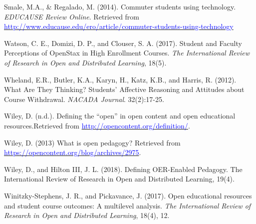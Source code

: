 \documentclass[11pt]{article}
\newcommand{\alink}[2]{\href{#1}{\textcolor{blue}{#2}}}
\begin{document}
\begin{thebibliography}{99}
   Smale, M.A., \& Regalado, M. (2014). Commuter students using technology. {\em EDUCAUSE Review Online}. Retrieved from \alink{http://www.educause.edu/ero/article/commuter-students-using-technology}{http://www.educause.edu/ero/article/commuter-students-using-technology}  

   Watson, C. E., Domizi, D. P., and Clouser, S. A. (2017). Student and Faculty Perceptions of OpenStax in High Enrollment Courses. {\em The International Review of Research in Open and Distributed Learning}, 18(5). %

   Wheland, E.R., Butler, K.A., Karyn, H., Katz, K.B., and Harris, R. (2012). What Are They Thinking? Students' Affective Reasoning and Attitudes about Course Withdrawal. {\em NACADA Journal}. 32(2):17-25.

   Wiley, D. (n.d.). Defining the ``open'' in open content and open educational resources.\newline Retrieved from \alink{http://opencontent.org/definition/}{http://opencontent.org/definition/}.

   Wiley, D. (2013) What is open pedagogy? \newline Retrieved from \alink{https://opencontent.org/blog/archives/2975}{https://opencontent.org/blog/archives/2975}.

   Wiley, D., and Hilton III, J. L. (2018). Defining OER-Enabled Pedagogy. The International Review of Research in Open and Distributed Learning, 19(4).

   Winitzky-Stephens, J. R., and Pickavance, J. (2017). Open educational resources and student course outcomes: A multilevel analysis. {\em The International Review of Research in Open and Distributed Learning}, 18(4), 12.

\end{thebibliography}
\end{document}
